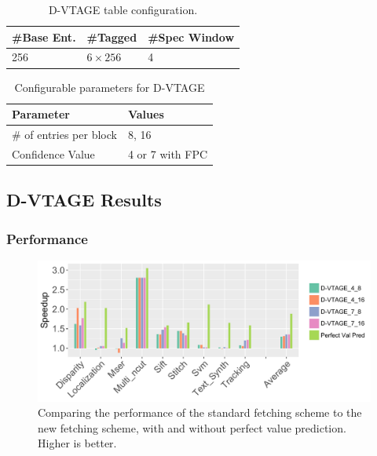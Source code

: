 \begin{table}[t]
  \small
  \centering
 \begin{tabular} {| l | l | l |}
 \hline
	\#Base Ent. & \#Tagged & \#Spec Window\\ \hline
	256 & $6\times256$ & 4 \\ \hline
	\end{tabular}
  \caption{D-VTAGE table configuration.}\label{tab:vtage-conf}
  \vspace{1em}
\end{table}


\begin{table}[t]
\small
\centering
\begin{tabular}{p{5.2cm} p{1.8cm}}
\toprule
\textbf{Parameter} & \textbf{Values} \\ \midrule
\# of entries per block & 8, 16\\
Confidence Value & 4 or 7 with FPC \\ \bottomrule
\end{tabular}
\caption{Configurable parameters for D-VTAGE}\label{tab:vtage-params}
\end{table}

\subsection{D-VTAGE Results}

\subsubsection{Performance}

\begin{figure}[t]
    \centering
    \includegraphics[width=1\textwidth]{chapter3/graphics/vtage_speed2.pdf}
    \caption{Comparing the performance of the standard fetching scheme to the new fetching scheme, with and without perfect value prediction. Higher is better.}
    \label{fig:vtage_perf}
	\vspace{1em}
\end{figure}

